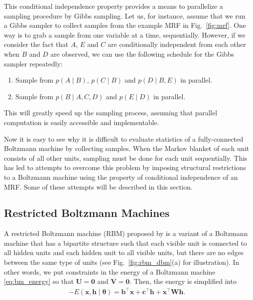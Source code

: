 \documentclass[dissertation,nocontribution,draft*]{aaltoseries}
\newcommand{\vect}[1]{\mathbf{#1}}
\newcommand{\vects}[1]{\boldsymbol{#1}}
\newcommand{\matr}[1]{\mathbf{#1}}
\newcommand{\vb}[0]{\vect{b}}
\newcommand{\vc}[0]{\vect{c}}
\newcommand{\vh}[0]{\vect{h}}
\newcommand{\vx}[0]{\vect{x}}
\newcommand{\mW}[0]{\matr{W}}
\newcommand{\mU}[0]{\matr{U}}
\newcommand{\mV}[0]{\matr{V}}
\newcommand{\mzero}[0]{\matr{0}}
\newcommand{\TT}[0]{{\vects{\theta}}}
\begin{document}
This conditional independence property provides a means to
parallelize a sampling procedure by Gibbs sampling. Let
us, for instance, assume that we run a Gibbs sampler to
collect samples from the example MRF in Fig.~\ref{fig:mrf}. One way is to grab a
sample from one variable at a time, sequentially. However,
if we consider the fact that $A$, $E$ and $C$ are
conditionally independent from each other when $B$ and $D$
are observed, we can use the following schedule for the
Gibbs sampler repeatedly:
\begin{enumerate}
    \itemsep 0em
    \item Sample from $p(A\mid B)$, $p(C \mid B)$ and $p(D
        \mid B, E)$ in parallel.
    \item Sample from $p(B \mid A, C, D)$ and $p(E \mid D)$
        in parallel.
\end{enumerate}
This will greatly speed up the sampling process, assuming
that parallel computation is easily accessible and
implementable.

Now it is easy to see why it is difficult to evaluate
statistics of a fully-connected Boltzmann machine by
collecting samples. When the Markov blanket of each unit
consists of all other units, sampling must be done for each
unit sequentially. This has led to attempts to overcome this
problem by imposing structural restrictions to a Boltzmann
machine using the property of conditional independence of an
MRF. Some of these attempts will be described in this section.

\subsection{Restricted Boltzmann Machines}
\label{sec:rbm}

A restricted Boltzmann machine (RBM) proposed by
\citet{Smolensky1986} is a variant of a Boltzmann machine
that has a bipartite structure such that each visible unit
is connected to all hidden units and each hidden unit to all
visible units, but there are no edges between the same type of units
(see Fig.~\ref{fig:rbm_dbm}(a) for illustration). In other
words, we put constraints in the energy of a Boltzmann
machine \eqref{eq:bm_energy} so that $\mU = \mzero$ and $\mV =
\mzero$.  Then, the energy is simplified into 
\begin{align}
    \label{eq:rbm_energy}
    -E(\vx, \vh \mid \TT) = \vb^\top \vx + \vc^\top \vh +
    \vx^\top \mW \vh.
\end{align}
\end{document}
